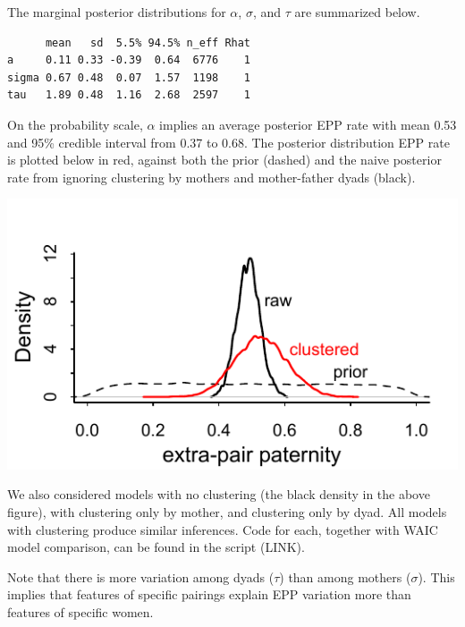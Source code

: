 \documentclass[reqno ,12pt]{amsart}
\begin{document}
The marginal posterior distributions for $\alpha$, $\sigma$, and $\tau$ are summarized below.
\begin{verbatim}
      mean   sd  5.5% 94.5% n_eff Rhat
a     0.11 0.33 -0.39  0.64  6776    1
sigma 0.67 0.48  0.07  1.57  1198    1
tau   1.89 0.48  1.16  2.68  2597    1
\end{verbatim}
On the probability scale, $\alpha$ implies an average posterior EPP rate with mean 0.53 and 95\% credible interval from 0.37 to 0.68. The posterior distribution EPP rate is plotted below in red, against both the prior (dashed) and the naive posterior rate from ignoring clustering by mothers and mother-father dyads (black).
\begin{center}
	\includegraphics[scale=1]{EPP_posterior.pdf}
\end{center}

We also considered models with no clustering (the black density in the above figure), with clustering only by mother, and clustering only by dyad. All models with clustering produce similar inferences. Code for each, together with WAIC model comparison, can be found in the script (LINK).

Note that there is more variation among dyads ($\tau$) than among mothers ($\sigma$). This implies that features of specific pairings explain EPP variation more than features of specific women.

%
%
\end{document}
